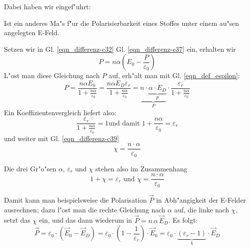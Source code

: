 Dabei haben wir eingef"uhrt:
\begin{Def}
    Ist ein anderes Ma"s f"ur die Polarisierbarkeit eines Stoffes
   unter einem au"sen angelegten E-Feld.
\end{Def}



Setzen wir in Gl. \eqref{eqn_differenz-c32} Gl. \eqref{eqn_differenz-c37} ein, erhalten wir
\begin{equation*}
   \label{eqn_differenz-c40}
    P = n \alpha \left (E_0 -  \frac{P}{\varepsilon_0} \right )
\end{equation*}
L"ost man diese Gleichung nach $P$ auf, erh"alt man mit
Gl. \eqref{eqn_def_espilon}:
\begin{equation*}
   \label{eqn_differenz-c41}
   P = \frac{n\alpha E_0}{1 + \frac{n\alpha}{\varepsilon_0}} =
 \frac{n\alpha E_D \varepsilon_r}{1 + \frac{n\alpha}{\varepsilon_0}} =
\underbrace{n \cdot \underbrace{\alpha \cdot E_D}_p}_{P} \cdot  \frac{\varepsilon_r}{1 + \frac{n\alpha}{\varepsilon_0}}
\end{equation*}
Ein Koeffizientenvergleich liefert also:
\begin{equation*}
   \label{eqn_differenz-c42}
    \frac{\varepsilon_r}{1 + \frac{n\alpha}{\varepsilon_0}} = 1 \text{
    und damit } 1 + \frac{n\alpha}{\varepsilon_0} = \varepsilon_r
\end{equation*}
und weiter mit Gl. \eqref{eqn_differenz-c39}
\begin{equation}
   \label{eqn_differenz-c43}
   \chi = \frac{n\cdot \alpha}{\varepsilon_0}
\end{equation}

\bigskip
Die drei Gr"o"sen $\alpha$, $\varepsilon_r$ und $\chi$ stehen also im
Zusammenhang
$$1 + \chi = \varepsilon_r \text{ und } \chi = \frac{n\cdot
  \alpha}{\varepsilon_0}$$

Damit kann man beispielsweise die Polarisation $\vec P$ in
Abh"angigkeit der E-Felder ausrechnen; dazu l"ost man die rechte
Gleichung nach $\alpha$ auf, die linke nach $\chi$, setzt das $\chi$
ein, und das dann wiederum in $\vec{{P}} = n \, \alpha \, \vec E_D$. Es folgt:
\begin{equation}
   \label{eqn_differenz-c44}
   \vec{{P}} = \varepsilon_0 \cdot ( \vec E_0 - \vec E_D) = \varepsilon_0 \cdot
   \left (1
   - \frac{1}{\varepsilon_r} \right ) \cdot \vec E_0 = \varepsilon_0 \cdot
 \underbrace{ (\varepsilon_r - 1) }_\chi \cdot \vec E_D
\end{equation}










